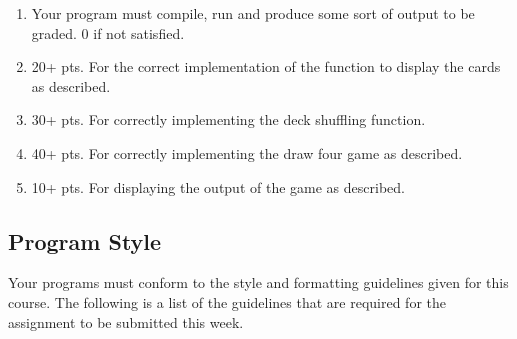 \documentclass[11pt]{article}
\begin{document}
\begin{enumerate}
\item Your program must compile, run and produce some sort of output to
be graded. 0 if not satisfied.
\item 20+ pts. For the correct implementation of the function to display the
cards as described.
\item 30+ pts. For correctly implementing the deck shuffling function.
\item 40+ pts. For correctly implementing the draw four game as described.
\item 10+ pts. For displaying the output of the game as described.
\end{enumerate}

\subsection*{Program Style}
\label{sec-5-2}

Your programs must conform to the style and formatting guidelines
given for this course.  The following is a list of the guidelines that
are required for the assignment to be submitted this week.
\end{document}
